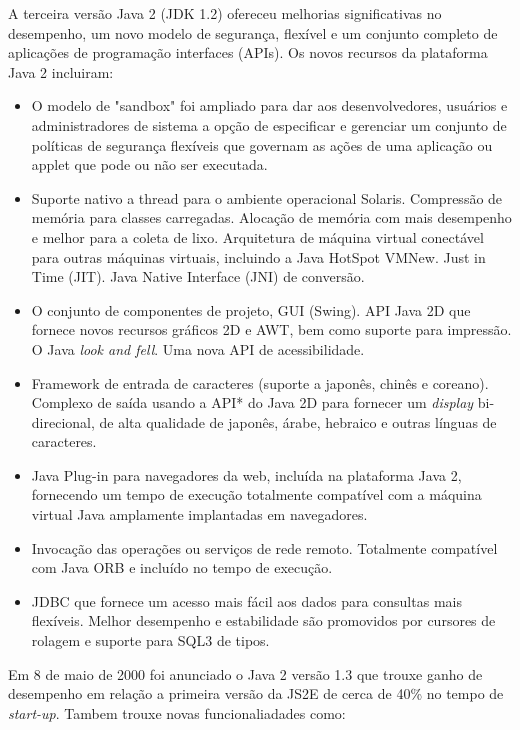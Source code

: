 A terceira versão Java 2 (JDK 1.2) ofereceu melhorias significativas no desempenho, um novo modelo de segurança, flexível e um conjunto completo de aplicações de programação interfaces (APIs). Os novos recursos da plataforma Java 2 incluiram: 
\begin{itemize}
  \item O modelo de "sandbox"  foi ampliado para dar aos desenvolvedores, usuários e administradores de sistema a opção de especificar e gerenciar um conjunto de políticas de segurança flexíveis que governam as ações de uma aplicação ou applet que pode ou não ser executada.
  \item Suporte nativo a thread para o ambiente operacional Solaris. Compressão de memória para classes carregadas. Alocação de memória com mais desempenho e melhor para a coleta de lixo. Arquitetura de máquina virtual conectável para outras máquinas virtuais, incluindo a Java HotSpot VMNew. Just in Time (JIT). Java Native Interface (JNI) de conversão.
  \item O conjunto de componentes de projeto, GUI (Swing). API Java 2D que fornece novos recursos gráficos 2D e AWT, bem como suporte para impressão. O Java {\it look and fell}. Uma nova API de acessibilidade.
  \item Framework de entrada de caracteres (suporte a japonês, chinês e coreano). Complexo de saída usando a API* do Java 2D para fornecer um {\it display} bi-direcional, de alta qualidade de japonês, árabe, hebraico e outras línguas de caracteres.
  \item Java Plug-in para navegadores da web, incluída na plataforma Java 2, fornecendo um tempo de execução totalmente compatível com a máquina virtual Java amplamente implantadas em navegadores.
  \item Invocação das operações ou serviços de rede remoto. Totalmente compatível com Java ORB e incluído no tempo de execução.
  \item JDBC que fornece um acesso mais fácil aos dados para consultas mais flexíveis. Melhor desempenho e estabilidade são promovidos por cursores de rolagem e suporte para SQL3 de tipos.\\
\end{itemize}

Em 8 de maio de 2000 foi anunciado o Java 2 versão 1.3 que trouxe ganho de desempenho em relação a primeira versão da JS2E de cerca de 40\%  no tempo de {\it  start-up}. Tambem trouxe novas funcionaliadades como: 

